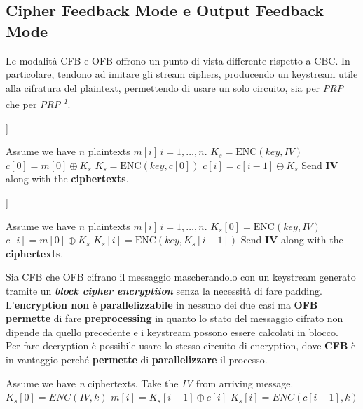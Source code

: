 \subsection{Cipher Feedback Mode e Output Feedback Mode}
Le modalità CFB e OFB offrono un punto di vista differente rispetto a CBC. In particolare, tendono ad imitare gli stream ciphers, producendo un keystream utile alla cifratura del plaintext, permettendo di usare un solo circuito, sia per \textit{PRP} che per \textit{PRP\textsuperscript{-1}}.
\begin{definition}[Cipher Feedback Mode - CFB [Encryption]]\label{alg:cfb}
\begin{algorithmic}[1]
\State Assume we have $n$ plaintexts $m[i]\,i=1,\dots,n$.
\State $K_s=\text{ENC}(key, IV)$
\State $c[0]=m[0]\oplus{K_s}$
    \State $K_s=\text{ENC}(key, c[0])$
    \State $c[i] = c[i-1]\oplus K_s$
\EndFor
\State Send \textbf{IV} along with the \textbf{ciphertexts}.
\end{algorithmic}
\end{definition}
\begin{definition}[Output Feedback Mode - OFB [Encryption]]\label{alg:ofb}
\begin{algorithmic}[1]
\State Assume we have $n$ plaintexts $m[i]\,i=1,\dots,n$.
\State $K_s[0]=\text{ENC}(key, IV)$
    \State $c[i]=m[0]\oplus{K_s}$
    \State $K_s[i]=\text{ENC}(key, K_s[i-1])$ 
\EndFor
\State Send \textbf{IV} along with the \textbf{ciphertexts}.
\end{algorithmic}
\end{definition}
Sia CFB che OFB cifrano il messaggio mascherandolo con un keystream generato tramite un \textbf{\textit{block cipher encryptiion}} senza la necessità di fare padding. L'\textbf{encryption non} è \textbf{parallelizzabile} in nessuno dei due casi ma \textbf{OFB permette} di fare \textbf{preprocessing} in quanto lo stato del messaggio cifrato non dipende da quello precedente e i keystream possono essere calcolati in blocco.\\
Per fare decryption è possibile usare lo stesso circuito di encryption, dove \textbf{CFB} è in vantaggio perché \textbf{permette} di \textbf{parallelizzare} il processo.
\begin{definition}
\begin{algorithmic}[1]
\State Assume we have \textit{n} ciphertexts.
\State Take the \textit{IV} from arriving message.
\State $K_s[0] = ENC(IV, k)$
\State $m[i] = K_s[i-1]\oplus{c[i]}$
\State $K_s[i] = ENC(c[i-1], k)$
\EndFor
\end{algorithmic}
\end{definition}

